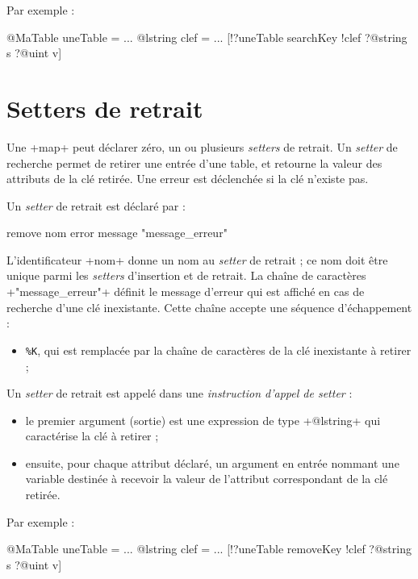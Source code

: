 Par exemple :
\begin{galgascode}
@MaTable uneTable = {}
...
@lstring clef = ...
[!?uneTable searchKey !clef ?@string s ?@uint v]
\end{galgascode}













\section{Setters de retrait}

Une \ggs+map+ peut déclarer zéro, un ou plusieurs \emph{setters} de retrait. Un \emph{setter} de recherche permet de retirer une entrée d'une table, et retourne la valeur des attributs de la clé retirée. Une erreur est déclenchée si la clé n'existe pas.


Un \emph{setter} de retrait est déclaré par :

\begin{galgascode}
remove nom error message "message_erreur"
\end{galgascode}

L'identificateur \ggs+nom+ donne un nom au \emph{setter} de retrait ; ce nom doit être unique parmi les \emph{setters} d'insertion et de retrait. La chaîne de caractères \ggs+"message_erreur"+ définit le message d'erreur qui est affiché en cas de recherche d'une clé inexistante. Cette chaîne accepte une séquence d'échappement :
\begin{itemize}
  \item \texttt{\%K}, qui est remplacée par la chaîne de caractères de la clé inexistante à retirer ;
\end{itemize}


Un \emph{setter} de retrait est appelé dans une \emph{instruction d'appel de setter} :
\begin{itemize}
  \item le premier argument (sortie) est une expression de type \ggs+@lstring+ qui caractérise la clé à retirer ;
  \item ensuite, pour chaque attribut déclaré, un argument en entrée nommant une variable destinée à recevoir la valeur de l'attribut correspondant de la clé retirée.
\end{itemize}

Par exemple :
\begin{galgascode}
@MaTable uneTable = {}
...
@lstring clef = ...
[!?uneTable removeKey !clef ?@string s ?@uint v]
\end{galgascode}

